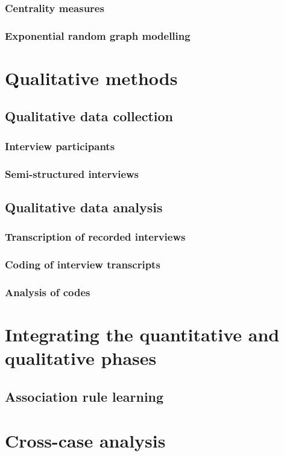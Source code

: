 \subsubsection{Centrality measures}

\subsubsection{Exponential random graph modelling}

\section{Qualitative methods}

\subsection{Qualitative data collection}

\subsubsection{Interview participants}

\subsubsection{Semi-structured interviews}

\subsection{Qualitative data analysis}

\subsubsection{Transcription of recorded interviews}

\subsubsection{Coding of interview transcripts}

\subsubsection{Analysis of codes}

\section{Integrating the quantitative and qualitative phases}

\subsection{Association rule learning}

\section{Cross-case analysis}
